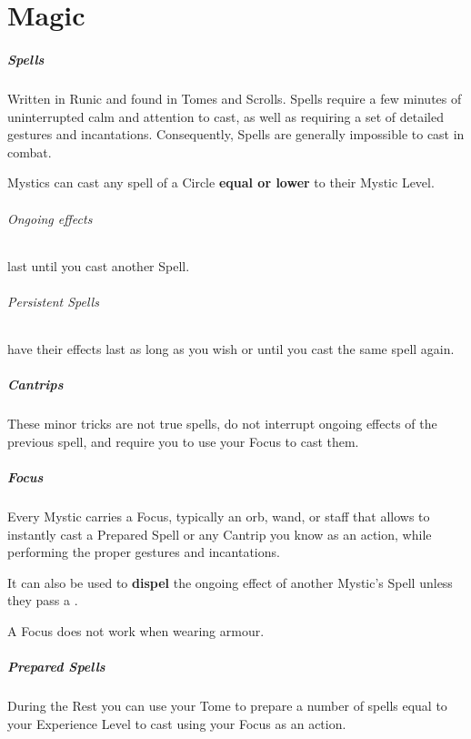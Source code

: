\documentclass[itdr]{subfiles}
\begin{document}
\chapter{Magic}

\paragraph{Spells}
Written in Runic and found in Tomes and Scrolls. Spells require a few minutes of uninterrupted calm and attention to cast, as well as requiring a set of detailed gestures and incantations. Consequently, Spells are generally impossible to cast in combat.

Mystics can cast any spell of a Circle \textbf{equal or lower} to their Mystic Level.

\subparagraph{Ongoing effects} last until you cast another Spell.

\subparagraph{Persistent Spells} have their effects last as long as you wish or until you cast the same spell again.

\paragraph{Cantrips}
These minor tricks are not true spells, do not interrupt ongoing effects of the previous spell, and require you to use your Focus to cast them.

\vfill
{}
\paragraph{Focus}
Every Mystic carries a Focus, typically an orb, wand, or staff that allows to instantly cast a Prepared Spell or any Cantrip you know as an action, while performing the proper gestures and incantations.

It can also be used to \textbf{dispel} the ongoing effect of another Mystic's Spell unless they pass a .

A Focus does not work when wearing armour.

\vfill
{}
\paragraph{Prepared Spells}
During the Rest you can use your Tome to prepare a number of spells equal to your Experience Level to cast using your Focus as an action.
\end{document}
